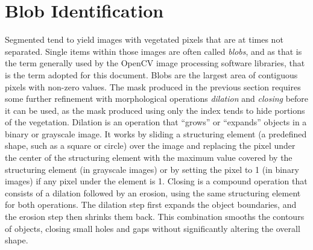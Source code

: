\documentclass[letterpaper]{report}
\begin{document}
{\section{Blob Identification}
Segmented tend to yield images with  vegetated pixels that are at times not separated. Single items within those images are often called \textit{blobs}, and as that is the term generally used by the OpenCV image processing software libraries, that is the term adopted for this document. Blobs are the largest area of contiguous pixels with non-zero values.  The mask produced in the previous section requires some further refinement with morphological operations \textit{dilation} and \textit{closing} before it can be used, as the mask produced using only the index tends to hide portions of the vegetation. Dilation is an operation that “grows” or “expands” objects in a binary or grayscale image. It works by sliding a structuring element (a predefined shape, such as a square or circle) over the image and replacing the pixel under the center of the structuring element with the maximum value covered by the structuring element (in grayscale images) or by setting the pixel to 1 (in binary images) if any pixel under the element is 1. Closing is a compound operation that consists of a dilation followed by an erosion, using the same structuring element for both operations. The dilation step first expands the object boundaries, and the erosion step then shrinks them back. This combination smooths the contours of objects, closing small holes and gaps without significantly altering the overall shape.

}
\end{document}
